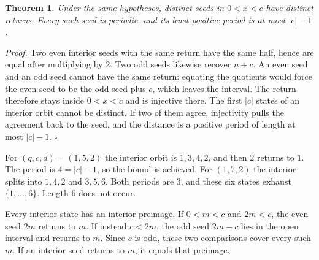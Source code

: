 \documentclass[11pt,letterpaper]{article}
\newtheorem{theorem}{Theorem}
\newenvironment{proof}{\noindent\textit{Proof.}}{\hfill\(\square\)}
\begin{document}
\begin{theorem}
\label{thm:interiorperiod}
Under the same hypotheses, distinct seeds in \(0<x<c\) have distinct returns. Every such seed is periodic, and its least positive period is at most \(\lvert c\rvert-1\).
\end{theorem}

\begin{proof}
Two even interior seeds with the same return have the same half, hence are equal after multiplying by \(2\). Two odd seeds likewise recover \(n+c\). An even seed and an odd seed cannot have the same return: equating the quotients would force the even seed to be the odd seed plus \(c\), which leaves the interval. The return therefore stays inside \(0<x<c\) and is injective there. The first \(\lvert c\rvert\) states of an interior orbit cannot be distinct. If two of them agree, injectivity pulls the agreement back to the seed, and the distance is a positive period of length at most \(\lvert c\rvert-1\).
\end{proof}

For \((q,c,d)=(1,5,2)\) the interior orbit is \(1,3,4,2\), and then \(2\) returns to \(1\). The period is \(4=\lvert c\rvert-1\), so the bound is achieved. For \((1,7,2)\) the interior splits into \(1,4,2\) and \(3,5,6\). Both periods are \(3\), and these six states exhaust \(\{1,\ldots,6\}\). Length \(6\) does not occur.

Every interior state has an interior preimage. If \(0<m<c\) and \(2m<c\), the even seed \(2m\) returns to \(m\). If instead \(c<2m\), the odd seed \(2m-c\) lies in the open interval and returns to \(m\). Since \(c\) is odd, these two comparisons cover every such \(m\). If an interior seed returns to \(m\), it equals that preimage.
\end{document}
